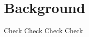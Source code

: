 \chapter{Background}

Check\cite{parish2001procedural}
Check\cite{kelly2006survey}
Check\cite{de2011survey}
Check\cite{galin2010procedural}
